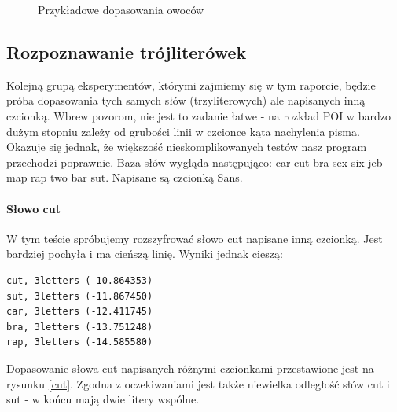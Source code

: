 \documentclass[a4paper,12pt,leqno]{article}
\begin{document}
\begin{figure}
\caption{Przykładowe dopasowania owoców}\label{matches}
\end{figure}

\subsection{Rozpoznawanie trójliterówek}
Kolejną grupą eksperymentów, którymi zajmiemy się w tym raporcie, będzie próba dopasowania tych samych słów (trzyliterowych) ale napisanych inną czcionką.
Wbrew pozorom, nie jest to zadanie łatwe - na rozkład POI w bardzo dużym stopniu zależy od grubości linii w czcionce kąta nachylenia pisma. Okazuje się jednak, że większość nieskomplikowanych 
testów nasz program przechodzi poprawnie.
Baza słów wygląda następująco: car cut bra sex six jeb map rap two bar sut. Napisane są czcionką Sans.
\paragraph{Słowo cut}
W tym teście spróbujemy rozszyfrować słowo cut napisane inną czcionką. Jest bardziej pochyła i ma cieńszą linię.
Wyniki jednak cieszą:
\begin{verbatim}
cut, 3letters (-10.864353)
sut, 3letters (-11.867450)
car, 3letters (-12.411745)
bra, 3letters (-13.751248)
rap, 3letters (-14.585580)
\end{verbatim}
Dopasowanie słowa cut napisanych różnymi czcionkami przestawione jest na rysunku \ref{cut}.
Zgodna z oczekiwaniami jest także niewielka odległość słów cut i sut - w końcu mają dwie litery wspólne.
\end{document}
